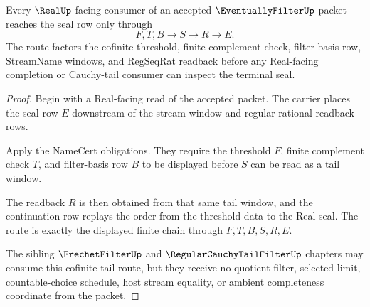 \begin{theorem}
\label{thm:eventually-filter-real-facing-route}
Every $\RealUp$-facing consumer of an accepted $\EventuallyFilterUp$ packet reaches the seal row only through
$$
F,T,B \longrightarrow S \longrightarrow R \longrightarrow E .
$$
The route factors the cofinite threshold, finite complement check, filter-basis row, StreamName windows, and RegSeqRat readback before any Real-facing completion or Cauchy-tail consumer can inspect the terminal seal.
\end{theorem}
\begin{proof}
Begin with a Real-facing read of the accepted packet. The carrier places the seal row $E$ downstream of the stream-window and regular-rational readback rows.

Apply the NameCert obligations. They require the threshold $F$, finite complement check $T$, and filter-basis row $B$ to be displayed before $S$ can be read as a tail window.

The readback $R$ is then obtained from that same tail window, and the continuation row replays the order from the threshold data to the Real seal. The route is exactly the displayed finite chain through $F,T,B,S,R,E$.

The sibling $\FrechetFilterUp$ and $\RegularCauchyTailFilterUp$ chapters may consume this cofinite-tail route, but they receive no quotient filter, selected limit, countable-choice schedule, host stream equality, or ambient completeness coordinate from the packet.
\end{proof}




